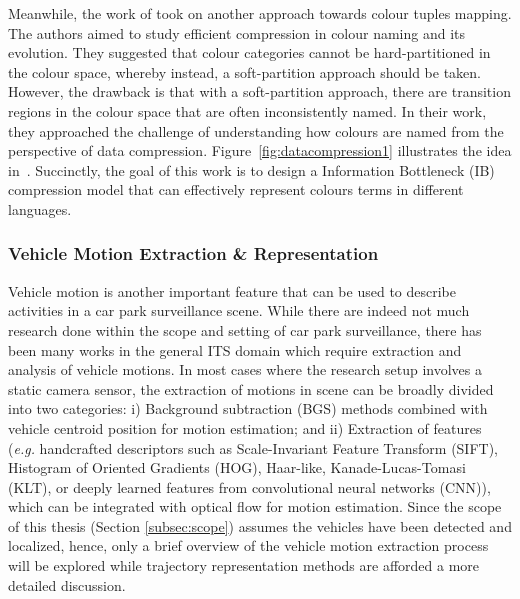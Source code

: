 Meanwhile, the work of \cite{zaslavsky2018efficient} took on another approach towards
colour tuples mapping. The authors aimed to study efficient compression in colour naming and its evolution. They suggested that colour categories cannot be hard-partitioned in the colour space, whereby instead, a soft-partition approach should be taken. However, the drawback is that with a soft-partition approach, there are transition regions in the colour space that are often inconsistently named. In their work, they approached the challenge of understanding how colours are named from the perspective of data compression. Figure~\ref{fig:datacompression1} illustrates the idea in~\cite{zaslavsky2018efficient}. Succinctly, the goal of this work is to design a Information Bottleneck (IB) compression model that can effectively represent colours terms in different languages.

\subsubsection{Vehicle Motion Extraction \& Representation}
\label{subsec:vehiclemotionextraction}

Vehicle motion is another important feature that can be used to describe activities in a car park surveillance scene. While there are indeed not much research done within the scope and setting of car park surveillance, there has been many works in the general ITS domain which require extraction and analysis of vehicle motions. In most cases where the research setup involves a static camera sensor, the extraction of motions in scene can be broadly divided into two categories:
i) Background subtraction (BGS) methods combined with vehicle centroid position for motion estimation; and ii) Extraction of features (\emph{e.g.} handcrafted descriptors such as Scale-Invariant Feature Transform (SIFT), Histogram of Oriented Gradients (HOG), Haar-like, Kanade-Lucas-Tomasi (KLT), or deeply learned features from convolutional neural networks (CNN)), which can be integrated with optical flow for motion estimation. 
Since the scope of this thesis (Section \ref{subsec:scope}) assumes the vehicles have been detected and localized, hence, only a brief overview of the vehicle motion extraction process will be explored while trajectory representation methods are afforded a more detailed discussion.

